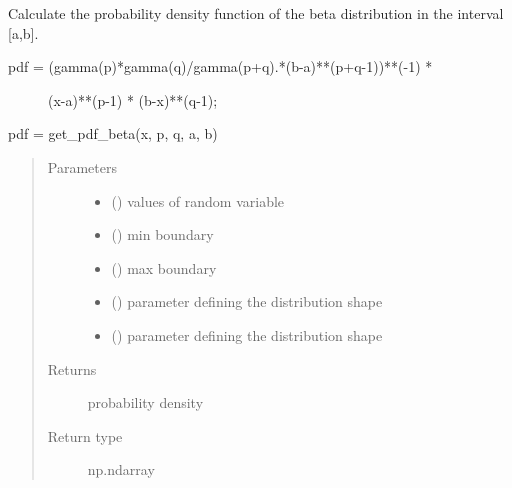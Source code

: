 \documentclass[letterpaper,10pt,english,openany,oneside]{sphinxmanual}
\begin{document}

\begin{fulllineitems}
\label{\detokenize{pygpc:pygpc.misc.get_pdf_beta}}
Calculate the probability density function of the beta distribution in the interval {[}a,b{]}.
\begin{description}
\item[{pdf = (gamma(p)*gamma(q)/gamma(p+q).*(b-a)**(p+q-1))**(-1) *}] \leavevmode
(x-a)**(p-1) * (b-x)**(q-1);

\end{description}

pdf = get\_pdf\_beta(x, p, q, a, b)
\begin{quote}\begin{description}
\item[{Parameters}] \leavevmode\begin{itemize}
\item {} 
 () \textendash{} values of random variable

\item {} 
 () \textendash{} min boundary

\item {} 
 () \textendash{} max boundary

\item {} 
 () \textendash{} parameter defining the distribution shape

\item {} 
 () \textendash{} parameter defining the distribution shape

\end{itemize}

\item[{Returns}] \leavevmode
{} \textendash{} probability density

\item[{Return type}] \leavevmode
np.ndarray

\end{description}\end{quote}

\end{fulllineitems}
\end{document}
